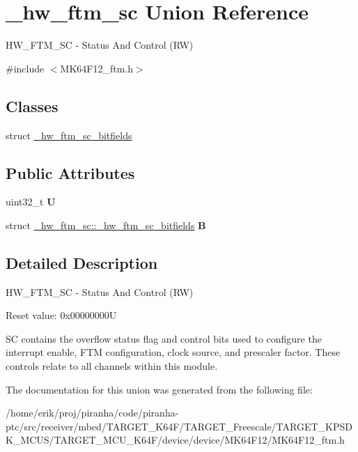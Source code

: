 \hypertarget{union__hw__ftm__sc}{}\section{\+\_\+hw\+\_\+ftm\+\_\+sc Union Reference}
\label{union__hw__ftm__sc}


H\+W\+\_\+\+F\+T\+M\+\_\+\+SC -\/ Status And Control (RW)  




{\ttfamily \#include $<$M\+K64\+F12\+\_\+ftm.\+h$>$}

\subsection*{Classes}
\begin{DoxyCompactItemize}
\item 
struct \hyperlink{struct__hw__ftm__sc_1_1__hw__ftm__sc__bitfields}{\+\_\+hw\+\_\+ftm\+\_\+sc\+\_\+bitfields}
\end{DoxyCompactItemize}
\subsection*{Public Attributes}
\begin{DoxyCompactItemize}
\item 
uint32\+\_\+t {\bfseries U}\hypertarget{union__hw__ftm__sc_a3c0b194b2e73c10f8e9b3e23fed502c7}{}\label{union__hw__ftm__sc_a3c0b194b2e73c10f8e9b3e23fed502c7}

\item 
struct \hyperlink{struct__hw__ftm__sc_1_1__hw__ftm__sc__bitfields}{\+\_\+hw\+\_\+ftm\+\_\+sc\+::\+\_\+hw\+\_\+ftm\+\_\+sc\+\_\+bitfields} {\bfseries B}\hypertarget{union__hw__ftm__sc_a574a6db1ba20ab4ac010e860bf1028b1}{}\label{union__hw__ftm__sc_a574a6db1ba20ab4ac010e860bf1028b1}

\end{DoxyCompactItemize}


\subsection{Detailed Description}
H\+W\+\_\+\+F\+T\+M\+\_\+\+SC -\/ Status And Control (RW) 

Reset value\+: 0x00000000U

SC contains the overflow status flag and control bits used to configure the interrupt enable, F\+TM configuration, clock source, and prescaler factor. These controls relate to all channels within this module. 

The documentation for this union was generated from the following file\+:\begin{DoxyCompactItemize}
\item 
/home/erik/proj/piranha/code/piranha-\/ptc/src/receiver/mbed/\+T\+A\+R\+G\+E\+T\+\_\+\+K64\+F/\+T\+A\+R\+G\+E\+T\+\_\+\+Freescale/\+T\+A\+R\+G\+E\+T\+\_\+\+K\+P\+S\+D\+K\+\_\+\+M\+C\+U\+S/\+T\+A\+R\+G\+E\+T\+\_\+\+M\+C\+U\+\_\+\+K64\+F/device/device/\+M\+K64\+F12/M\+K64\+F12\+\_\+ftm.\+h\end{DoxyCompactItemize}
